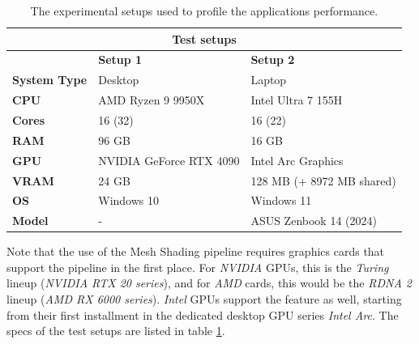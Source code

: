 \begin{table}[h]          %
    \begin{tabular}{|lll|}
        \hline
        \multicolumn{3}{|c|}{\textbf{Test setups}}                                                                              \\ \hline
        \multicolumn{1}{|l|}{}                     & \multicolumn{1}{l|}{\textbf{Setup 1}}          & \textbf{Setup 2}          \\ \hline
        \multicolumn{1}{|l|}{\textbf{System Type}} & \multicolumn{1}{l|}{Desktop}                   & Laptop                    \\
        \multicolumn{1}{|l|}{\textbf{CPU}}         & \multicolumn{1}{l|}{AMD Ryzen 9 9950X}         & Intel Ultra 7 155H        \\
        \multicolumn{1}{|l|}{\textbf{Cores}}       & \multicolumn{1}{l|}{16 (32)}                   & 16 (22)                   \\
        \multicolumn{1}{|l|}{\textbf{RAM}}         & \multicolumn{1}{l|}{96 GB}                     & 16 GB                     \\
        \multicolumn{1}{|l|}{\textbf{GPU}}         & \multicolumn{1}{l|}{NVIDIA GeForce RTX 4090}   & Intel Arc Graphics        \\
        \multicolumn{1}{|l|}{\textbf{VRAM}}        & \multicolumn{1}{l|}{24 GB}                     & 128 MB (+ 8972 MB shared) \\
        \multicolumn{1}{|l|}{\textbf{OS}}          & \multicolumn{1}{l|}{Windows 10}                & Windows 11                \\
        \multicolumn{1}{|l|}{\textbf{Model}}       & \multicolumn{1}{l|}{-}                         & ASUS Zenbook 14 (2024)    \\ \hline
    \end{tabular}
    \caption{The experimental setups used to profile the applications performance.}
    \label{tbl:hardware-setup}
\end{table}

\noindent
Note that the use of the Mesh Shading pipeline requires graphics cards that support the pipeline in the first place. 
For \emph{NVIDIA} \ac{GPU}s, this is the \emph{Turing} lineup (\emph{NVIDIA RTX 20 series}), and for \emph{AMD} cards, 
this would be the \emph{RDNA 2} lineup (\emph{AMD RX 6000 series}). \emph{Intel} \ac{GPU}s support the feature as 
well, starting from their first installment in the dedicated desktop \ac{GPU} series \emph{Intel Arc}. The specs of 
the test setups are listed in table \ref{tbl:hardware-setup}. \\


